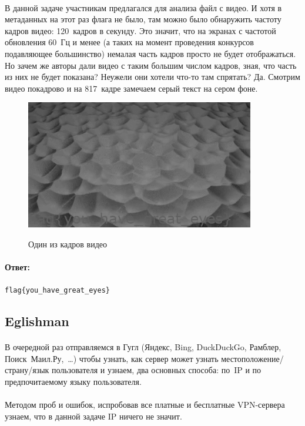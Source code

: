 \documentclass[12pt]{article}
\begin{document}
	\paragraph{}
    В данной задаче участникам предлагался для анализа файл с видео.
	И хотя в метаданных на этот раз флага не было, там можно было обнаружить частоту кадров видео: 120~кадров в секунду.
	Это значит, что на экранах с частотой обновления 60~Гц и менее
	(а таких на момент проведения конкурсов подавляющее большинство)
	немалая часть кадров просто не будет отображаться.
	Но зачем же авторы дали видео с таким большим числом кадров, зная, что часть из них не будет показана?
	Неужели они хотели что-то там спрятать?
	Да.
	Смотрим видео покадрово и на 817~кадре замечаем серый текст на сером фоне.
    \begin{figure}[H]
        \centering
        \includegraphics[width=10cm]{task30}
        \label{fig:task30}
        \caption{Один из кадров видео}
    \end{figure}
    \paragraph{Ответ:}
    \verb|flag{you_have_great_eyes}|

    \subsection{Eglishman}
	\paragraph{}
    В очередной раз отправляемся в Гугл (Яндекс, Bing, DuckDuckGo, Рамблер, Поиск~Маил.Ру,~\ldots)
	чтобы узнать, как сервер может узнать местоположение/страну/язык пользователя и узнаем, два основных способа:
	по~IP и по предпочитаемому языку пользователя.
    \paragraph{}
	Методом проб и ошибок, испробовав все платные и бесплатные VPN-сервера узнаем,
	что в данной задаче IP ничего не значит.
\end{document}
